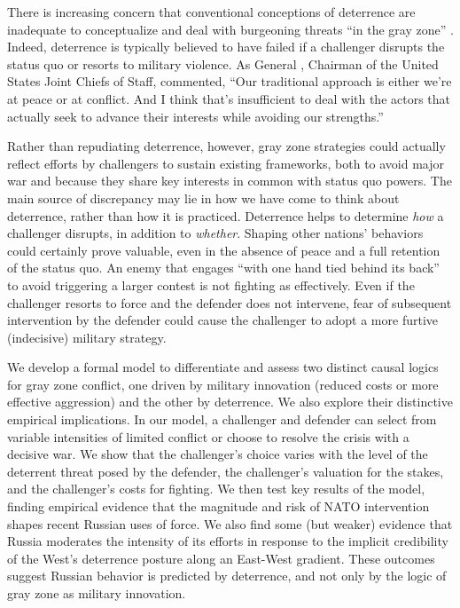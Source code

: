 \documentclass[bibtex, autowc]{apsr_submission}
\begin{document}
There is increasing concern that conventional conceptions of deterrence are inadequate to conceptualize and deal with burgeoning threats ``in the gray zone'' \citep{matisek_shadesgraydeterrence_2017}. Indeed, deterrence is typically believed to have failed if a challenger disrupts the status quo or resorts to military violence. As General \citet{dunford_gendunfordremarks_2016}, Chairman of the United States Joint Chiefs of Staff, commented, “Our traditional approach is either we’re at peace or at conflict. And I think that’s insufficient to deal with the actors that actually seek to advance their interests while avoiding our strengths.” 

Rather than repudiating deterrence, however, gray zone strategies could actually reflect efforts by challengers to sustain existing frameworks, both to avoid major war and because they share key interests in common with status quo powers. The main source of discrepancy may lie in how we have come to think about deterrence, rather than how it is practiced. Deterrence helps to determine \textit{how} a challenger disrupts, in addition to \textit{whether}. Shaping other nations' behaviors could certainly prove valuable, even in the absence of peace and a full retention of the status quo. An enemy that engages ``with one hand tied behind its back'' to avoid triggering a larger contest is not fighting as effectively. Even if the challenger resorts to force and the defender does not intervene, fear of subsequent intervention by the defender could cause the challenger to adopt a more furtive (indecisive) military strategy.

We develop a formal model to differentiate and assess two distinct causal logics for gray zone conflict, one driven by military innovation (reduced costs or more effective aggression) and the other by deterrence. We also explore their distinctive empirical implications. In our model, a challenger and defender can select from variable intensities of limited conflict or choose to resolve the crisis with a decisive war. We show that the challenger's choice varies with the level of the deterrent threat posed by the defender, the challenger's valuation for the stakes, and the challenger's costs for fighting. We then test key results of the model, finding empirical evidence that the magnitude and risk of NATO intervention shapes recent Russian uses of force. We also find some (but weaker) evidence that Russia moderates the intensity of its efforts in response to the implicit credibility of the West's deterrence posture along an East-West gradient. These outcomes suggest Russian behavior is predicted by deterrence, and not only by the logic of gray zone as military innovation. 
\end{document}
